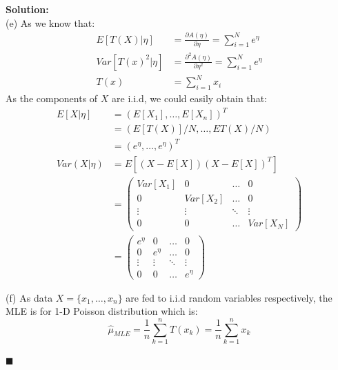 \documentclass{article}
\newenvironment{solution}                               %
{\textbf{Solution:} \\}{$\blacksquare$\newline}         %
\begin{document}
\begin{solution}
        (e)
        As we know that:
        \begin{align*}
            E[T(X)|\eta] &= \frac{\partial A(\eta)}{\partial \eta}
            = \sum\limits_{i=1}^{N}{e^{\eta}}
            \\
            Var[T(x)^2|\eta] &= \frac{\partial^2 A(\eta)}{\partial \eta^2}
            = \sum\limits_{i=1}^{N}{e^{\eta}}
            \\
            T(x) &= \sum_{i=1}^{N}{x_i}
        \end{align*}
        As the components of $X$ are i.i.d, we could easily obtain that:
        \begin{align*}
            E[X|\eta] &= (E[X_1], \dots, E[X_n])^T \\
            &= (E[T(X)]/N, \dots, E{T(X)}/N)\\
            &= (e^\eta, \dots, e^\eta)^T
            \\
            Var(X|\eta) &= E[(X-E[X])(X-E[X])^T] \\
            &= \begin{pmatrix}
                Var[X_1] & 0 & \dots & 0 \\
                0 & Var[X_2] & \dots & 0 \\
                \vdots & \vdots & \ddots & \vdots \\
                0 & 0 & \dots & Var[X_N]
            \end{pmatrix} \\
            &= \begin{pmatrix}
                e^{\eta} & 0 & \dots & 0 \\
                0 & e^{\eta} & \dots & 0 \\
                \vdots & \vdots & \ddots & \vdots \\
                0 & 0 & \dots & e^{\eta}
            \end{pmatrix}
        \end{align*}

        (f) As data $X=\{x_1, \dots, x_n\}$ are fed to i.i.d random variables respectively,
        the MLE is for 1-D Poisson distribution which is:
        $$
        \hat{\mu}_{MLE} = \frac{1}{n} \sum\limits_{k=1}^{n} T(x_k) = \frac{1}{n} \sum\limits_{k=1}^{n} x_k
        $$


\end{solution}
\end{document}
